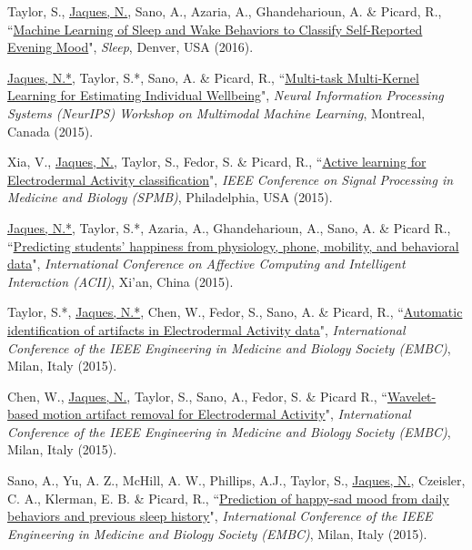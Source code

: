 \documentclass[paper=letter,fontsize=11pt]{scrartcl} %
\newcommand{\PaperEntry}[6]{
		\noindent #1, ``\href{#6}{#2}", \textit{#3}, #4 (#5).}
\begin{document}
\begin{etaremune}
\item \PaperEntry{Taylor, S., \underline{Jaques, N.}, Sano, A., Azaria, A., Ghandeharioun, A. \& Picard, R.}{Machine Learning of Sleep and Wake Behaviors to Classify Self-Reported Evening Mood}{Sleep}{Denver, USA}{2016}{https://affect.media.mit.edu/pdfs/16.Taylor-ClassifyingSelfReportedMood-SLEEP2016.pdf}

\item \PaperEntry{\underline{Jaques, N.*}, Taylor, S.*, Sano, A. \& Picard, R.}{Multi-task Multi-Kernel Learning for Estimating Individual Wellbeing}{Neural Information Processing Systems (NeurIPS) Workshop on Multimodal Machine Learning}{Montreal, Canada}{2015}{https://affect.media.mit.edu/pdfs/15.Jaques-etal-NIPSMMML.pdf}

\item \PaperEntry{Xia, V., \underline{Jaques, N.}, Taylor, S., Fedor, S. \& Picard, R.}{Active learning for Electrodermal Activity classification}{IEEE Conference on Signal Processing in Medicine and Biology (SPMB)}{Philadelphia, USA}{2015}{https://dspace.mit.edu/openaccess-disseminate/1721.1/109392}

\item \PaperEntry{\underline{Jaques, N.*}, Taylor, S.*, Azaria, A., Ghandeharioun, A., Sano, A. \& Picard R.}{Predicting students' happiness from physiology, phone, mobility, and behavioral data}{International Conference on Affective Computing and Intelligent Interaction (ACII)}{Xi'an, China}{2015}{https://www.ncbi.nlm.nih.gov/pmc/articles/PMC5431070/}

\item \PaperEntry{Taylor, S.*, \underline{Jaques, N.*}, Chen, W., Fedor, S., Sano, A. \& Picard, R.}{Automatic identification of artifacts in Electrodermal Activity data}{International Conference of the IEEE Engineering in Medicine and Biology Society (EMBC)}{Milan, Italy}{2015}{https://www.ncbi.nlm.nih.gov/pmc/articles/PMC5413200/}

\item \PaperEntry{Chen, W., \underline{Jaques, N.}, Taylor, S., Sano, A., Fedor, S. \& Picard R.}{Wavelet-based motion artifact removal for Electrodermal Activity}{International Conference of the IEEE Engineering in Medicine and Biology Society (EMBC)}{Milan, Italy}{2015}{https://www.ncbi.nlm.nih.gov/pmc/articles/PMC5413204/}

\item \PaperEntry{Sano, A., Yu, A. Z., McHill, A. W., Phillips, A.J., Taylor, S., \underline{Jaques, N.}, Czeisler, C. A., Klerman, E. B. \& Picard, R.}{Prediction of happy-sad mood from daily behaviors and previous sleep history}{International Conference of the IEEE Engineering in Medicine and Biology Society (EMBC)}{Milan, Italy}{2015}{https://www.ncbi.nlm.nih.gov/pmc/articles/PMC4768795/}


\end{etaremune}
\end{document}
